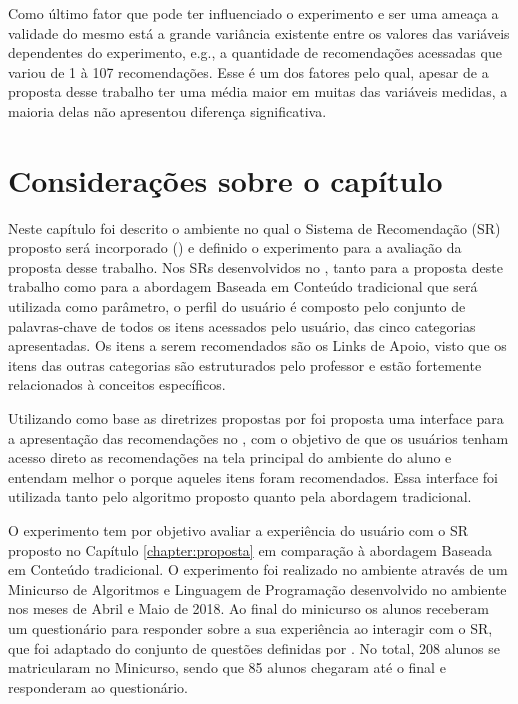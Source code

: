 Como último fator que pode ter influenciado o experimento e ser uma ameaça a validade do mesmo está a grande variância
existente entre os valores das variáveis dependentes do experimento, e.g., a quantidade de recomendações acessadas que variou
de 1 à 107 recomendações. Esse é um dos fatores pelo qual, apesar de a proposta desse trabalho ter uma média maior em
muitas das variáveis medidas, a maioria delas não apresentou diferença significativa.

\section{Considerações sobre o capítulo}

Neste capítulo foi descrito o ambiente no qual o Sistema de Recomendação (SR) proposto será incorporado (\adaptweb) e definido o
experimento para a avaliação da proposta desse trabalho. Nos SRs desenvolvidos no \adaptweb, tanto para a proposta deste trabalho como para a abordagem
Baseada em Conteúdo tradicional que será utilizada como parâmetro, o perfil do usuário é composto pelo conjunto de palavras-chave de todos os itens acessados pelo usuário, das
cinco categorias apresentadas. Os itens a serem recomendados são os Links de Apoio, visto que os itens das outras categorias
são estruturados pelo professor e estão fortemente relacionados à conceitos específicos.

Utilizando como base as diretrizes propostas por  foi proposta uma interface para a apresentação das recomendações no \adaptweb,
com o objetivo de que os usuários tenham acesso direto as recomendações na tela principal do ambiente do aluno e entendam
melhor o porque aqueles itens foram recomendados. Essa interface foi utilizada tanto pelo algoritmo proposto
quanto pela abordagem tradicional.

O experimento tem por objetivo avaliar a experiência do usuário com o SR proposto no Capítulo \ref{chapter:proposta} em
comparação à abordagem Baseada em Conteúdo tradicional. O experimento foi realizado no ambiente
\adaptwebspace através de um Minicurso de Algoritmos e Linguagem de Programação desenvolvido no ambiente nos meses de
Abril e Maio de 2018. Ao final do minicurso os alunos receberam um questionário para responder sobre a sua experiência
ao interagir com o SR, que foi adaptado do conjunto de questões definidas por . No total, 208 alunos
se matricularam no Minicurso, sendo que 85 alunos chegaram até o final e responderam ao questionário.

